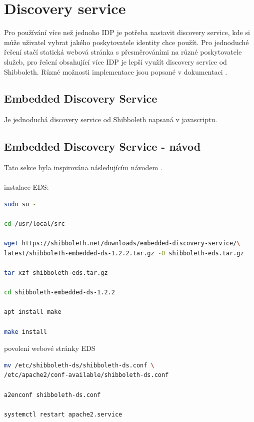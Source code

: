 \section{Discovery service}
Pro používání více než jednoho IDP je potřeba nastavit discovery service, kde si může uživatel vybrat jakého poskytovatele identity chce použít. Pro jednoduché řešení stačí statická webová stránka s přesměrováními na různé poskytovatele služeb, pro řešení obsahující více IDP je lepší využít discovery service od Shibboleth. Různé možnosti implementace jsou popsané v dokumentaci \cite{IdPDiscovery}.

\subsection{Embedded Discovery Service}
Je jednoduchá discovery service od Shibboleth napsaná v javascriptu. 

\subsection{Embedded Discovery Service - návod}
Tato sekce byla inspirována následujícím návodem \cite{EDS-tut}. \\ \\
instalace EDS:
\begin{lstlisting}[language=Bash]
sudo su -

cd /usr/local/src

wget https://shibboleth.net/downloads/embedded-discovery-service/\
latest/shibboleth-embedded-ds-1.2.2.tar.gz -O shibboleth-eds.tar.gz

tar xzf shibboleth-eds.tar.gz

cd shibboleth-embedded-ds-1.2.2

apt install make

make install
\end{lstlisting}

povolení webové stránky EDS

\begin{lstlisting}[language=Bash]
mv /etc/shibboleth-ds/shibboleth-ds.conf \
/etc/apache2/conf-available/shibboleth-ds.conf

a2enconf shibboleth-ds.conf

systemctl restart apache2.service
\end{lstlisting}

